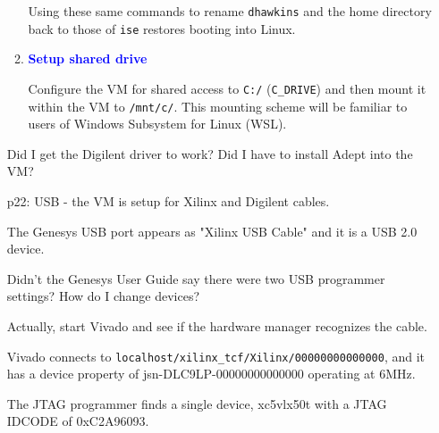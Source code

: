 \begin{enumerate}
\begin{enumerate}
Using these same commands to rename \verb+dhawkins+ and the home directory back to those of \verb+ise+ restores booting into Linux.

\item \textcolor{blue}{\bf Setup shared drive}

Configure the VM for shared access to \verb+C:/+ (\verb+C_DRIVE+) and then mount it within
the VM to \verb+/mnt/c/+. This mounting scheme will be familiar to users of Windows 
Subsystem for Linux (WSL).

\end{enumerate}


Did I get the Digilent driver to work? Did I have to install Adept into the VM?

p22: USB - the VM is setup for Xilinx and Digilent cables.

The Genesys USB port appears as "Xilinx USB Cable" and it is a USB 2.0 device.

Didn't the Genesys User Guide say there were two USB programmer settings? How do I change devices?

Actually, start Vivado and see if the hardware manager recognizes the cable.

Vivado connects to \verb+localhost/xilinx_tcf/Xilinx/00000000000000+, and it has a
device property of jsn-DLC9LP-00000000000000 operating at 6MHz. 

The JTAG programmer finds a single device, xc5vlx50t with a JTAG IDCODE of 0xC2A96093.


\end{enumerate}


